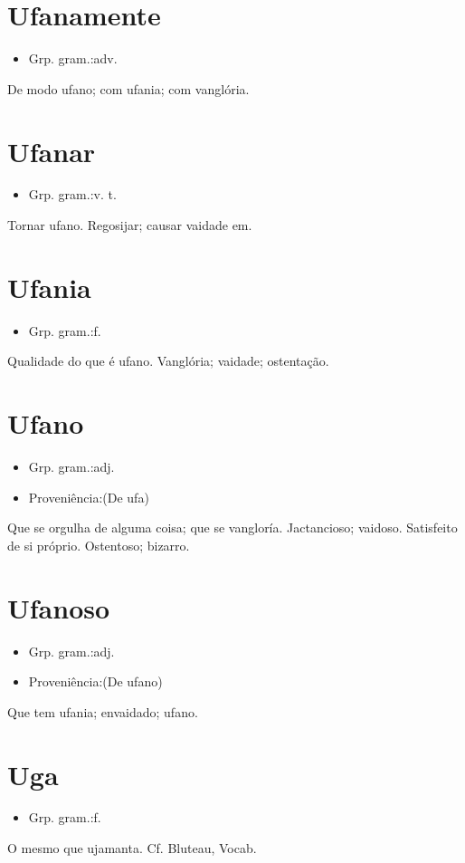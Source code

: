 \documentclass{article}
\begin{document}
\section{Ufanamente}
\begin{itemize}
\item {Grp. gram.:adv.}
\end{itemize}
De modo ufano; com ufania; com vanglória.
\section{Ufanar}
\begin{itemize}
\item {Grp. gram.:v. t.}
\end{itemize}
Tornar ufano.
Regosijar; causar vaidade em.
\section{Ufania}
\begin{itemize}
\item {Grp. gram.:f.}
\end{itemize}
Qualidade do que é ufano.
Vanglória; vaidade; ostentação.
\section{Ufano}
\begin{itemize}
\item {Grp. gram.:adj.}
\end{itemize}
\begin{itemize}
\item {Proveniência:(De \textunderscore ufa\textunderscore )}
\end{itemize}
Que se orgulha de alguma coisa; que se vangloría.
Jactancioso; vaidoso.
Satisfeito de si próprio.
Ostentoso; bizarro.
\section{Ufanoso}
\begin{itemize}
\item {Grp. gram.:adj.}
\end{itemize}
\begin{itemize}
\item {Proveniência:(De \textunderscore ufano\textunderscore )}
\end{itemize}
Que tem ufania; envaidado; ufano.
\section{Uga}
\begin{itemize}
\item {Grp. gram.:f.}
\end{itemize}
O mesmo que \textunderscore ujamanta\textunderscore . Cf. Bluteau, \textunderscore Vocab.\textunderscore 
\end{document}
